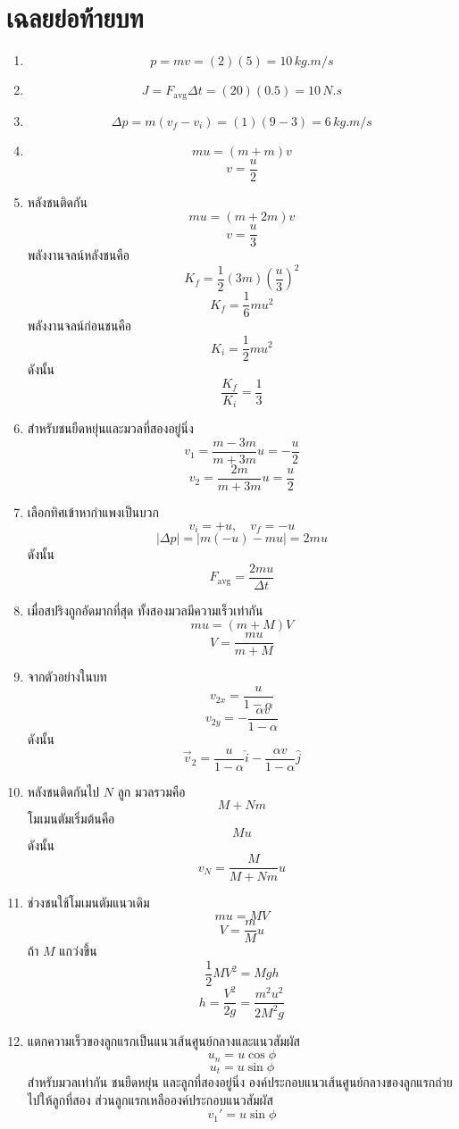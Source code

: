 \section{เฉลยย่อท้ายบท}

\begin{enumerate}
    \item
    \[
    p=mv=(2)(5)=10\,\si{kg.m/s}
    \]

    \item
    \[
    J=F_{\text{avg}}\Delta t=(20)(0.5)=10\,\si{N.s}
    \]

    \item
    \[
    \Delta p=m(v_f-v_i)=(1)(9-3)=6\,\si{kg.m/s}
    \]

    \item
    \[
    mu=(m+m)v
    \]
    \[
    v=\frac{u}{2}
    \]

    \item
    หลังชนติดกัน
    \[
    mu=(m+2m)v
    \]
    \[
    v=\frac{u}{3}
    \]
    พลังงานจลน์หลังชนคือ
    \[
    K_f=\frac{1}{2}(3m)\left(\frac{u}{3}\right)^2
    \]
    \[
    K_f=\frac{1}{6}mu^2
    \]
    พลังงานจลน์ก่อนชนคือ
    \[
    K_i=\frac{1}{2}mu^2
    \]
    ดังนั้น
    \[
    \frac{K_f}{K_i}=\frac{1}{3}
    \]

    \item
    สำหรับชนยืดหยุ่นและมวลที่สองอยู่นิ่ง
    \[
    v_1=\frac{m-3m}{m+3m}u=-\frac{u}{2}
    \]
    \[
    v_2=\frac{2m}{m+3m}u=\frac{u}{2}
    \]

    \item
    เลือกทิศเข้าหากำแพงเป็นบวก
    \[
    v_i=+u,\quad v_f=-u
    \]
    \[
    |\Delta p|=|m(-u)-mu|=2mu
    \]
    ดังนั้น
    \[
    F_{\text{avg}}=\frac{2mu}{\Delta t}
    \]

    \item
    เมื่อสปริงถูกอัดมากที่สุด ทั้งสองมวลมีความเร็วเท่ากัน
    \[
    mu=(m+M)V
    \]
    \[
    V=\frac{mu}{m+M}
    \]

    \item
    จากตัวอย่างในบท
    \[
    v_{2x}=\frac{u}{1-\alpha}
    \]
    \[
    v_{2y}=-\frac{\alpha v}{1-\alpha}
    \]
    ดังนั้น
    \[
    \vec{v}_2=\frac{u}{1-\alpha}\hat{i}-\frac{\alpha v}{1-\alpha}\hat{j}
    \]

    \item
    หลังชนติดกันไป $N$ ลูก มวลรวมคือ
    \[
    M+Nm
    \]
    โมเมนตัมเริ่มต้นคือ
    \[
    Mu
    \]
    ดังนั้น
    \[
    v_N=\frac{M}{M+Nm}u
    \]

    \item
    ช่วงชนใช้โมเมนตัมแนวเดิม
    \[
    mu=MV
    \]
    \[
    V=\frac{m}{M}u
    \]
    ถ้า $M$ แกว่งขึ้น
    \[
    \frac{1}{2}MV^2=Mgh
    \]
    \[
    h=\frac{V^2}{2g}=\frac{m^2u^2}{2M^2g}
    \]

    \item
    แตกความเร็วของลูกแรกเป็นแนวเส้นศูนย์กลางและแนวสัมผัส
    \[
    u_n=u\cos\phi
    \]
    \[
    u_t=u\sin\phi
    \]
    สำหรับมวลเท่ากัน ชนยืดหยุ่น และลูกที่สองอยู่นิ่ง องค์ประกอบแนวเส้นศูนย์กลางของลูกแรกถ่ายไปให้ลูกที่สอง ส่วนลูกแรกเหลือองค์ประกอบแนวสัมผัส
    \[
    \boxed{v_1'=u\sin\phi}
    \]
\end{enumerate}

